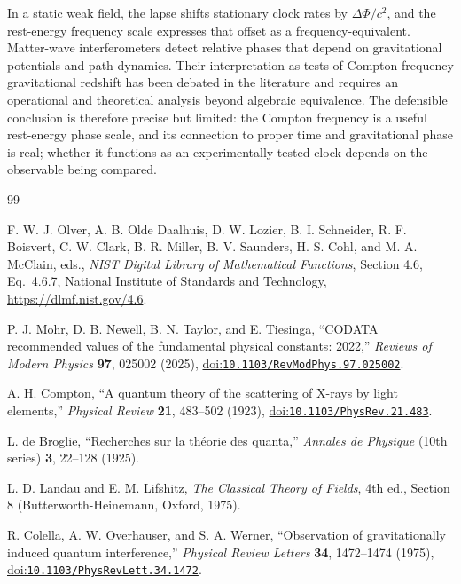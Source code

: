 \documentclass[12pt]{article}
\begin{document}
In a static weak field, the lapse shifts stationary clock rates by $\Delta\Phi/c^2$, and the rest-energy frequency scale expresses that offset as a frequency-equivalent. Matter-wave interferometers detect relative phases that depend on gravitational potentials and path dynamics. Their interpretation as tests of Compton-frequency gravitational redshift has been debated in the literature and requires an operational and theoretical analysis beyond algebraic equivalence. The defensible conclusion is therefore precise but limited: the Compton frequency is a useful rest-energy phase scale, and its connection to proper time and gravitational phase is real; whether it functions as an experimentally tested clock depends on the observable being compared.

\begin{thebibliography}{99}
\small
{}
\raggedright
{}

F. W. J. Olver, A. B. Olde Daalhuis, D. W. Lozier, B. I. Schneider, R. F. Boisvert, C. W. Clark, B. R. Miller, B. V. Saunders, H. S. Cohl, and M. A. McClain, eds.,
\emph{NIST Digital Library of Mathematical Functions}, Section 4.6, Eq.~4.6.7, National Institute of Standards and Technology,
\url{https://dlmf.nist.gov/4.6}.

P. J. Mohr, D. B. Newell, B. N. Taylor, and E. Tiesinga,
``CODATA recommended values of the fundamental physical constants: 2022,''
\emph{Reviews of Modern Physics} \textbf{97}, 025002 (2025),
\href{https://doi.org/10.1103/RevModPhys.97.025002}{doi:\nolinkurl{10.1103/RevModPhys.97.025002}}.

A. H. Compton,
``A quantum theory of the scattering of X-rays by light elements,''
\emph{Physical Review} \textbf{21}, 483--502 (1923),
\href{https://doi.org/10.1103/PhysRev.21.483}{doi:\nolinkurl{10.1103/PhysRev.21.483}}.

L. de Broglie,
``Recherches sur la th\'eorie des quanta,''
\emph{Annales de Physique} (10th series) \textbf{3}, 22--128 (1925).

L. D. Landau and E. M. Lifshitz,
\emph{The Classical Theory of Fields}, 4th ed., Section 8 (Butterworth-Heinemann, Oxford, 1975).

R. Colella, A. W. Overhauser, and S. A. Werner,
``Observation of gravitationally induced quantum interference,''
\emph{Physical Review Letters} \textbf{34}, 1472--1474 (1975),
\href{https://doi.org/10.1103/PhysRevLett.34.1472}{doi:\nolinkurl{10.1103/PhysRevLett.34.1472}}.


\end{thebibliography}
\end{document}
